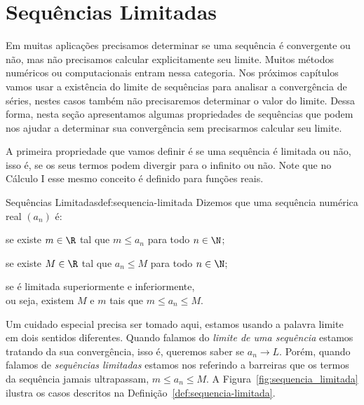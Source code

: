 \section{Sequências Limitadas}

Em muitas aplicações precisamos determinar se uma sequência é convergente ou não,
mas não precisamos calcular explicitamente seu limite. Muitos métodos numéricos
ou computacionais entram nessa categoria. Nos próximos capítulos vamos usar
a existência do limite de sequências para analisar a convergência de séries,
nestes casos também não precisaremos determinar o valor do limite.
Dessa forma, nesta seção apresentamos algumas propriedades de sequências
que podem nos ajudar a determinar sua convergência sem precisarmos calcular
seu limite.

A primeira propriedade que vamos definir é se uma sequência é limitada ou não,
isso é, se os seus termos podem divergir para o infinito ou não. Note que no
Cálculo I esse mesmo conceito é definido para funções reais.

\begin{definicao}{Sequências Limitadas}{def:sequencia-limitada}
  Dizemos que uma sequência numérica real $(a_n)$ é:%
  \begin{description}[labelwidth=\widthof{\bfseries Limitada Superiormente}]
    \item[Limitada Inferiormente] \tabto{45mm} se existe $m\in\R$ tal que $m\leq a_n$ para todo $n\in \N$;
    \item[Limitada Superiormente] \tabto{45mm} se existe $M\in\R$ tal que $a_n\leq M$ para todo $n\in \N$;
    \item[Limitada]               \tabto{45mm} se é limitada superiormente e inferiormente, \\
                                  \tabto{45mm} ou seja, existem $M$ e $m$ tais que $m\leq a_n\leq M$.
  \end{description}
\end{definicao}

Um cuidado especial precisa ser tomado aqui, estamos usando a palavra
limite em dois sentidos diferentes. Quando falamos do \emph{limite de uma sequência}
estamos tratando da sua convergência, isso é, queremos saber se $a_n\to L$. Porém,
quando falamos de \emph{sequências limitadas} estamos nos referindo a barreiras
que os termos da sequência jamais ultrapassam, $m\leq a_n \leq M$.
A Figura~\ref{fig:sequencia_limitada} ilustra os casos descritos na
Definição~\ref{def:sequencia-limitada}.

